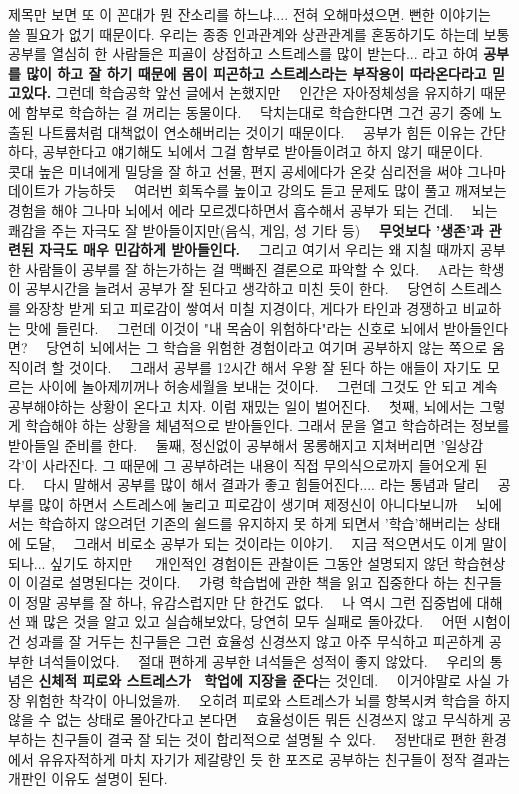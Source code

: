\vspace{5mm}

제목만 보면 또 이 꼰대가 뭔 잔소리를 하느냐.... 전혀 오해마셨으면. 뻔한 이야기는  쓸 필요가 없기 때문이다.
우리는 종종 인과관계와 상관관계를 혼동하기도 하는데
보통 공부를 열심히 한 사람들은 피골이 상접하고 스트레스를 많이 받는다... 라고 하여
\textbf{공부를 많이 하고 잘 하기 때문에 몸이 피곤하고 스트레스라는 부작용이 따라온다라고 믿고있다.}
그런데 학습공학 앞선 글에서 논했지만   인간은 자아정체성을 유지하기 때문에 함부로 학습하는 걸 꺼리는 동물이다.   닥치는대로 학습한다면 그건 공기 중에 노출된 나트륨처럼 대책없이 연소해버리는 것이기 때문이다.   공부가 힘든 이유는 간단하다, 공부한다고 얘기해도 뇌에서 그걸 함부로 받아들이려고 하지 않기 때문이다.   콧대 높은 미녀에게 밀당을 잘 하고 선물, 편지 공세에다가 온갖 심리전을 써야 그나마 데이트가 가능하듯   여러번 회독수를 높이고 강의도 듣고 문제도 많이 풀고 깨져보는 경험을 해야 그나마 뇌에서 에라 모르겠다하면서 흡수해서 공부가 되는 건데.   뇌는 쾌감을 주는 자극도 잘 받아들이지만(음식, 게임, 성 기타 등)   \textbf{무엇보다 '생존'과 관련된 자극도 매우 민감하게 받아들인다.}   그리고 여기서 우리는 왜 지칠 때까지 공부한 사람들이 공부를 잘 하는가하는 걸 맥빠진 결론으로 파악할 수 있다.   A라는 학생이 공부시간을 늘려서 공부가 잘 된다고 생각하고 미친 듯이 한다.   당연히 스트레스를 와장창 받게 되고 피로감이 쌓여서 미칠 지경이다, 게다가 타인과 경쟁하고 비교하는 맛에 들린다.   그런데 이것이 "내 목숨이 위험하다"라는 신호로 뇌에서 받아들인다면?   당연히 뇌에서는 그 학습을 위험한 경험이라고 여기며 공부하지 않는 쪽으로 움직이려 할 것이다.   그래서 공부를 12시간 해서 우왕 잘 된다 하는 애들이 자기도 모르는 사이에 놀아제끼꺼나 허송세월을 보내는 것이다.   그런데 그것도 안 되고 계속 공부해야하는 상황이 온다고 치자. 이럼 재밌는 일이 벌어진다.   첫째, 뇌에서는 그렇게 학습해야 하는 상황을 체념적으로 받아들인다. 그래서 문을 열고 학습하려는 정보를 받아들일 준비를 한다.   둘째, 정신없이 공부해서 몽롱해지고 지쳐버리면 '일상감각'이 사라진다. 그 때문에 그 공부하려는 내용이 직접 무의식으로까지 들어오게 된다.   다시 말해서 공부를 많이 해서 결과가 좋고 힘들어진다.... 라는 통념과 달리   공부를 많이 하면서 스트레스에 눌리고 피로감이 생기며 제정신이 아니다보니까   뇌에서는 학습하지 않으려던 기존의 쉴드를 유지하지 못 하게 되면서 '학습'해버리는 상태에 도달,   그래서 비로소 공부가 되는 것이라는 이야기.   지금 적으면서도 이게 말이 되나... 싶기도 하지만    개인적인 경험이든 관찰이든 그동안 설명되지 않던 학습현상이 이걸로 설명된다는 것이다.   가령 학습법에 관한 책을 읽고 집중한다 하는 친구들이 정말 공부를 잘 하나, 유감스럽지만 단 한건도 없다.   나 역시 그런 집중법에 대해선 꽤 많은 것을 알고 있고 실습해보았다, 당연히 모두 실패로 돌아갔다.   어떤 시험이건 성과를 잘 거두는 친구들은 그런 효율성 신경쓰지 않고 아주 무식하고 피곤하게 공부한 녀석들이었다.   절대 편하게 공부한 녀석들은 성적이 좋지 않았다.   우리의 통념은 \textbf{신체적 피로와 스트레스가  학업에 지장을 준다}는 것인데.   이거야말로 사실 가장 위험한 착각이 아니었을까.   오히려 피로와 스트레스가 뇌를 항복시켜 학습을 하지 않을 수 없는 상태로 몰아간다고 본다면   효율성이든 뭐든 신경쓰지 않고 무식하게 공부하는 친구들이 결국 잘 되는 것이 합리적으로 설명될 수 있다.   정반대로 편한 환경에서 유유자적하게 마치 자기가 제갈량인 듯 한 포즈로 공부하는 친구들이 정작 결과는 개판인 이유도 설명이 된다.   